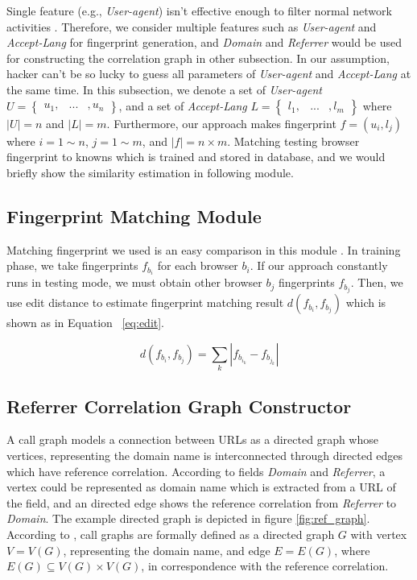 Single feature (e.g., {\em User-agent}) isn't effective enough to filter normal network activities \cite{bortolameotti2017decanter} \cite{kheir2013analyzing}. Therefore, we consider multiple features such as {\em User-agent} and {\em Accept-Lang} for fingerprint generation, and {\em Domain} and {\em Referrer} would be used for constructing the correlation graph in other subsection. In our assumption, hacker can't be so lucky to guess all parameters of {\em User-agent} and {\em Accept-Lang} at the same time. In this subsection, we denote a set of {\em User-agent} $U = \begin{Bmatrix} u_{1}, & ... & , u_{n} \end{Bmatrix}$, and a set of {\em Accept-Lang} $L = \begin{Bmatrix} l_{1}, & ... & , l_{m} \end{Bmatrix}$ where $\left | U \right | = n$ and $\left | L  \right | = m$. Furthermore, our approach makes fingerprint $f = (u_{i}, l_{j})$ where $i = 1 \sim n$, $j = 1 \sim m$, and $\left | f \right | = n \times m $. Matching testing browser fingerprint to knowns which is trained and stored in database, and we would briefly show the similarity estimation in following module.

\subsection{Fingerprint Matching Module}

Matching fingerprint we used is an easy comparison in this module \cite{bortolameotti2017decanter}. In training phase, we take fingerprints $f_{b_{i}}$ for each browser $b_{i}$. If our approach constantly runs in testing mode, we must obtain other browser $b_{j}$ fingerprints $f_{b_{j}}$. Then, we use edit distance to estimate fingerprint matching result $d(f_{b_{i}}, f_{b_{j}}) $ which is shown as in Equation ~\ref{eq:edit}.

\begin{equation}
        \label{eq:edit}
        d(f_{b_{i}}, f_{b_{j}}) = \sum_k \left |  f_{b_{i_{k}}} - f_{b_{j_{k}}} \right |  
\end{equation}

\subsection{Referrer Correlation Graph Constructor}

A call graph models a connection between URLs as a directed graph whose vertices, representing the domain name is interconnected through directed edges which have reference correlation. According to fields {\em Domain} and {\em Referrer}, a vertex could be represented as domain name which is extracted from a URL of the field, and an directed edge shows the reference correlation from {\em Referrer} to {\em Domain}. The example directed graph is depicted in figure \ref{fig:ref_graph}. According to \cite{kinable2011malware}, call graphs are formally defined as a directed graph $G$ with vertex $V = V(G)$, representing the domain name, and edge $E = E(G)$, where $E(G) \subseteq V(G) \times V(G) $, in correspondence with the reference correlation.

